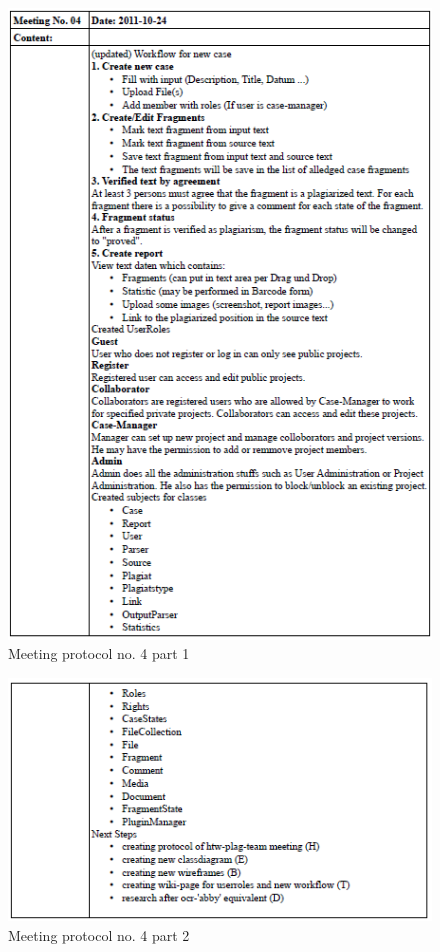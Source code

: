 \begin{appendix}
\begin{figure}
  \centering
    \includegraphics[width=\textwidth]{images/a_meetings/meeting_04a.png}
  \caption{Meeting protocol no. 4 part 1}
  \label{fig:meeting protocol no. 4 part 1}
\end{figure}

\begin{figure}
  \centering
    \includegraphics[width=\textwidth]{images/a_meetings/meeting_04b.png}
  \caption{Meeting protocol no. 4 part 2}
  \label{fig:meeting protocol no. 4 part 2}
\end{figure}



\end{appendix}
